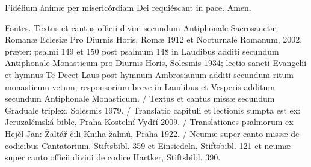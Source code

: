 \documentclass[a4paper, twoside, 12pt]{article}
\begin{document}


\pagebreak

\raggedcolumns

\cantusSineNeumas

\label{capitulum}
 


\trCapituliJudaei

\vfill



\noindent \trVersusVespI

\vfill

\vfill




\vfill



\vfill


\vfill
\pagebreak


\trOrationis

\vfill


\vfill

\noindent \Vbardot{} Fidélium ánimæ per misericórdiam Dei requiéscant in pace.
\Rbardot{} Amen.

\trFideliumAnimae

\vfill
\newpage
\RemoveSideThumbs
\pagestyle{empty}

\vfill

Fontes.
Textus et cantus officii divini secundum
Antiphonale Sacrosanctæ Romanæ Eclesiæ Pro Diurnis Horis, Romæ 1912
et Nocturnale Romanum, 2002, præter: psalmi 149 et 150 post
psalmum 148 in Laudibus additi secundum Antiphonale Monasticum pro Diurnis Horis,
Solesmis 1934; lectio sancti Evangelii et hymnus Te Decet Laus post hymnum
Ambrosianum additi secundum ritum monasticum vetum; responsorium breve
in Laudibus et Vesperis additum secundum Antiphonale Monasticum. /
Textus et cantus missæ secundum
Graduale triplex, Solesmis 1979. /
Translatio capituli et lectionis sumpta est ex:
Jeruzalémská bible, Praha-Kostelní Vydří 2009. /
Translationes psalmorum ex
Hejčl Jan: Žaltář čili Kniha žalmů, Praha 1922. /
Neumæ super canto missæ de codicibus Cantatorium, Stiftsbibl. 359 et Einsiedeln,
Stiftsbibl. 121 et neumæ super canto officii divini de codice Hartker,
Stiftsbibl. 390.
\end{document}
